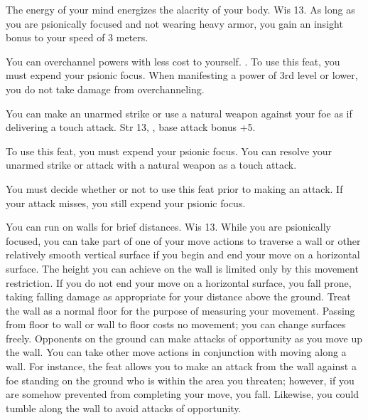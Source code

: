 
{The energy of your mind energizes the alacrity of your body.}
{Wis 13.}
{As long as you are psionically focused and not wearing heavy armor, you gain an insight bonus to your speed of 3 meters.}
{}{}

{You can overchannel powers with less cost to yourself.}
{.}
{To use this feat, you must expend your psionic focus. When manifesting a power of 3rd level or lower, you do not take damage from overchanneling.}
{}{}

{You can make an unarmed strike or use a natural weapon against your foe as if delivering a touch attack.}
{Str 13, , base attack bonus +5.}
{To use this feat, you must expend your psionic focus. You can resolve your unarmed strike or attack with a natural weapon as a touch attack.

You must decide whether or not to use this feat prior to making an attack. If your attack misses, you still expend your psionic focus.}
{}{}

{You can run on walls for brief distances.}
{Wis 13.}
{While you are psionically focused, you can take part of one of your move actions to traverse a wall or other relatively smooth vertical surface if you begin and end your move on a horizontal surface. The height you can achieve on the wall is limited only by this movement restriction. If you do not end your move on a horizontal surface, you fall prone, taking falling damage as appropriate for your distance above the ground. Treat the wall as a normal floor for the purpose of measuring your movement. Passing from floor to wall or wall to floor costs no movement; you can change surfaces freely. Opponents on the ground can make attacks of opportunity as you move up the wall.}
{}
{You can take other move actions in conjunction with moving along a wall. For instance, the  feat allows you to make an attack from the wall against a foe standing on the ground who is within the area you threaten; however, if you are somehow prevented from completing your move, you fall. Likewise, you could tumble along the wall to avoid attacks of opportunity.}

